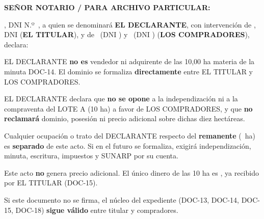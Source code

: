 \documentclass[12pt,a4paper]{article}
\begin{document}



\vspace{0.35em}
\noindent \textbf{SEÑOR NOTARIO / PARA ARCHIVO PARTICULAR:}

\vspace{0.2em}
\noindent \textbf{\IntermediarioNombre}, DNI N.º\ \IntermediarioDNI, a quien se denominará \textbf{EL DECLARANTE}, con intervención de \textbf{\VendedorNombreCompleto}, DNI \VendedorDNI (\textbf{EL TITULAR}), y de \textbf{\CompradorUnoNombre}\ (DNI \CompradorUnoDNI) y \textbf{\CompradorDosNombre}\ (DNI \CompradorDosDNI) (\textbf{LOS COMPRADORES}), declara:

EL DECLARANTE \textbf{no es} vendedor ni adquirente de las 10,00 ha materia de la minuta DOC-14. El dominio se formaliza \textbf{directamente} entre EL TITULAR y LOS COMPRADORES.

EL DECLARANTE declara que \textbf{no se opone} a la independización ni a la compraventa del LOTE A (10 ha) a favor de LOS COMPRADORES, y que \textbf{no reclamará} dominio, posesión ni precio adicional sobre dichas diez hectáreas.

Cualquier ocupación o trato del DECLARANTE respecto del \textbf{remanente} (\AreaRemanenteHa\ ha) es \textbf{separado} de este acto. Si en el futuro se formaliza, exigirá independización, minuta, escritura, impuestos y SUNARP por su cuenta.

Este acto \textbf{no} genera precio adicional. El único dinero de las 10 ha es \MontoPago, ya recibido por EL TITULAR (DOC-15).

Si este documento no se firma, el núcleo del expediente (DOC-13, DOC-14, DOC-15, DOC-18) \textbf{sigue válido} entre titular y compradores.

\LugarFecha
{}
\end{document}
